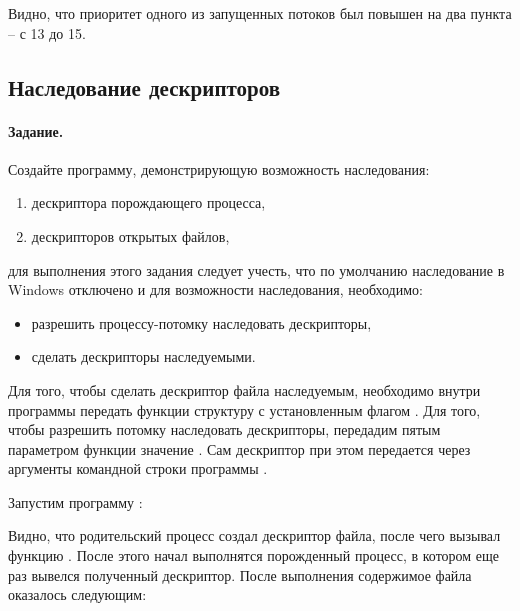 Видно, что приоритет одного из запущенных потоков был повышен на два пункта -- с 13 до 15.

\subsection{Наследование дескрипторов}

\paragraph{Задание.} Создайте программу, демонстрирующую возможность наследования:

\begin{enumerate}
	\item дескриптора порождающего процесса,
	\item дескрипторов открытых файлов,
\end{enumerate}
для выполнения этого задания следует учесть, что по умолчанию наследование в Windows отключено и для возможности наследования, необходимо:

\begin{itemize}
	\item разрешить процессу-потомку наследовать дескрипторы,
	\item сделать дескрипторы наследуемыми.
\end{itemize}

Для того, чтобы сделать дескриптор файла наследуемым, необходимо внутри программы  передать функции  структуру  с установленным флагом . Для того, чтобы разрешить потомку наследовать дескрипторы, передадим пятым параметром функции  значение . Сам дескриптор при этом передается через аргументы командной строки  программы .




Запустим программу :


Видно, что родительский процесс создал дескриптор файла, после чего вызывал функцию . После этого начал выполнятся порожденный процесс, в котором еще раз вывелся полученный дескриптор. После выполнения содержимое файла  оказалось следующим:


